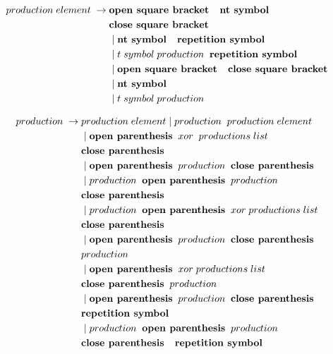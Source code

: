  

\begin{align*}
	production\;element\; \rightarrow\; & \textbf{open square bracket \; nt symbol} \\ 
			   &\textbf{close square bracket}\\
               &\mid \textbf{nt symbol \; repetition symbol} \\
               &\mid t\;symbol\;production\;\; \textbf{repetition symbol} \\
               &\mid \textbf{open square bracket \; close square bracket} \\
               &\mid \textbf{nt symbol} \\
               &\mid t\; symbol\; production 
\end{align*}




\begin{align*}
	production\; \rightarrow\; &production\; element
                \mid production\;\; production\; element \\
               &\mid \textbf{open parenthesis}\;\; xor\; \;productions\; list\;\; \\
               &\textbf{close parenthesis} \\
               &\mid \textbf{open parenthesis}\;\; production\;\; \textbf{close parenthesis} \\
               &\mid production \;\;\textbf{open parenthesis}\;\; production \\
               &\textbf{close parenthesis} \\
               &\mid production\;\; \textbf{open parenthesis} \;\;xor \;productions\; list\\
               &\textbf{close parenthesis} \\
               &\mid \textbf{open parenthesis} \;\;production \;\;\textbf{close parenthesis} \\
               &production \\
               &\mid \textbf{open parenthesis}\;\; xor\; productions\; list\\ 
               &\textbf{close parenthesis}\;\; production \\
               &\mid \textbf{open parenthesis}\;\; production\;\; \textbf{close parenthesis} \\
               &\textbf{repetition symbol}\\
               &\mid production\;\; \textbf{open parenthesis} \;\;production \\
               &\textbf{close parenthesis \; repetition symbol}
\end{align*}


